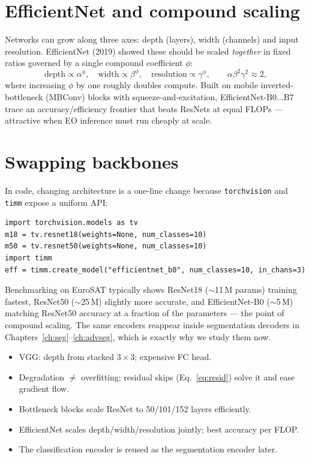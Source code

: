 \section{EfficientNet and compound scaling}

Networks can grow along three axes: depth (layers), width (channels) and input
resolution. EfficientNet (2019) showed these should be scaled \emph{together} in
fixed ratios governed by a single compound coefficient $\phi$:
\begin{equation}
\text{depth} \propto \alpha^{\phi},\quad
\text{width} \propto \beta^{\phi},\quad
\text{resolution} \propto \gamma^{\phi},\qquad
\alpha\beta^2\gamma^2 \approx 2,
\end{equation}
where increasing $\phi$ by one roughly doubles compute. Built on
mobile inverted-bottleneck (MBConv) blocks with squeeze-and-excitation,
EfficientNet-B0$\dots$B7 trace an accuracy/efficiency frontier that beats
ResNets at equal FLOPs --- attractive when EO inference must run cheaply at
scale.

\section{Swapping backbones}

In code, changing architecture is a one-line change because \texttt{torchvision}
and \texttt{timm} expose a uniform API:
\begin{lstlisting}
import torchvision.models as tv
m18 = tv.resnet18(weights=None, num_classes=10)
m50 = tv.resnet50(weights=None, num_classes=10)
import timm
eff = timm.create_model("efficientnet_b0", num_classes=10, in_chans=3)
\end{lstlisting}
Benchmarking on EuroSAT typically shows ResNet18 ($\sim$11\,M params) training
fastest, ResNet50 ($\sim$25\,M) slightly more accurate, and EfficientNet-B0
($\sim$5\,M) matching ResNet50 accuracy at a fraction of the parameters --- the
point of compound scaling. The same encoders reappear inside segmentation
decoders in Chapters~\ref{ch:seg}--\ref{ch:advseg}, which is exactly why we study
them now.

\begin{keybox}
\begin{itemize}[leftmargin=1.2em,nosep]
  \item VGG: depth from stacked $3\times3$; expensive FC head.
  \item Degradation $\ne$ overfitting; residual skips (Eq.~\ref{eq:resid}) solve it and ease gradient flow.
  \item Bottleneck blocks scale ResNet to 50/101/152 layers efficiently.
  \item EfficientNet scales depth/width/resolution jointly; best accuracy per FLOP.
  \item The classification encoder is reused as the segmentation encoder later.
\end{itemize}
\end{keybox}

